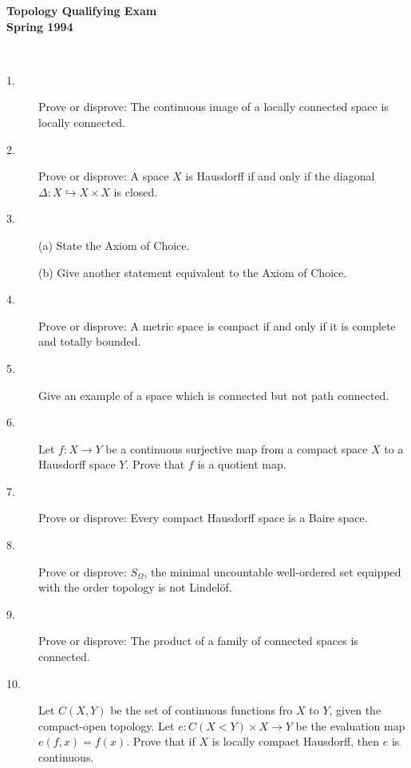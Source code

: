 \documentclass{article}
\begin{document}






\begin{center}\begin{LARGE}
{\bf Topology Qualifying Exam}\\ 
{\bf Spring 1994}\\ \end{LARGE}
\end{center}
\vspace{0.1in}
\noindent\hrulefill\\

\begin{description}
\item[1.]
Prove or disprove: The continuous image of a locally connected space is
locally connected.

\item[2.]
Prove or disprove: A space $X$ is Hausdorff if and only if the diagonal
$\Delta: X \hookrightarrow X \times X$ is closed.

\item[3.] (a)
State the Axiom of Choice.

\item[\quad] (b)
Give another statement equivalent to the Axiom of Choice.

\item[4.]
Prove or disprove: A metric space is compact if and only if it is complete
and totally bounded.

\item[5.]
Give an example of a space which is connected but not path connected.

\item[6.]
Let $f: X \to Y$ be a continuous surjective map from a compact space $X$
to a Hausdorff space $Y$. Prove that $f$ is a quotient map.

\item[7.]
Prove or disprove: Every compact Hausdorff space is a Baire space.

\item[8.]
Prove or disprove: $S_\Omega$, the minimal uncountable well-ordered set
equipped with the order topology is not Lindel\"of.

\item[9.]
Prove or disprove: The product of a family of connected spaces is connected.

\item[10.]
Let $C(X,Y)$ be the set of continuous functions fro $X$ to $Y$, given the
compact-open topology. Let $e: C(X<Y) \times X \to Y$ be the evaluation
map $e(f,x) = f(x)$. Prove that if $X$ is locally compact Hausdorff, then
$e$ is continuous.


\end{description}
\end{document}
